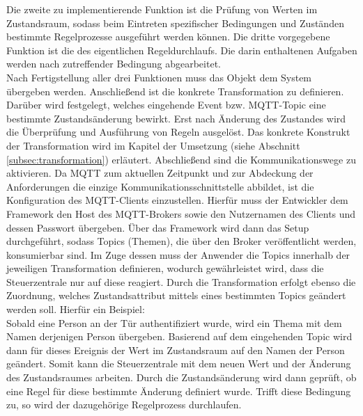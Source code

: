         Die zweite zu implementierende Funktion ist die Prüfung von Werten im Zustandsraum, sodass beim Eintreten spezifischer 
        Bedingungen und Zuständen bestimmte Regelprozesse ausgeführt werden können. Die dritte vorgegebene Funktion ist die 
        des eigentlichen Regeldurchlaufs. Die darin enthaltenen Aufgaben werden nach zutreffender Bedingung abgearbeitet.
        \\
        Nach Fertigstellung aller drei Funktionen muss das Objekt dem System übergeben werden. Anschließend ist die 
        konkrete Transformation zu definieren. Darüber wird festgelegt, welches eingehende Event bzw. \acs{MQTT}-Topic 
        eine bestimmte Zustandsänderung bewirkt. Erst nach Änderung des Zustandes wird die Überprüfung und Ausführung 
        von Regeln ausgelöst. Das konkrete Konstrukt der Transformation wird im Kapitel der Umsetzung (siehe Abschnitt \ref{subsec:transformation}) 
        erläutert. Abschließend sind die Kommunikationswege zu aktivieren. 
        Da \acs{MQTT} zum aktuellen Zeitpunkt und zur Abdeckung der Anforderungen die einzige Kommunikationsschnittstelle 
        abbildet, ist die Konfiguration des \acs{MQTT}-Clients einzustellen. Hierfür muss der Entwickler 
        dem Framework den Host des \acs{MQTT}-Brokers sowie den Nutzernamen des Clients und dessen Passwort übergeben. Über das 
        Framework wird dann das Setup durchgeführt, sodass Topics (Themen), die über den Broker veröffentlicht werden, konsumierbar 
        sind. Im Zuge dessen muss der Anwender die Topics innerhalb der jeweiligen Transformation definieren, wodurch gewährleistet wird, dass 
        die Steuerzentrale nur auf diese reagiert. Durch die Transformation erfolgt ebenso die 
        Zuordnung, welches Zustandsattribut mittels eines bestimmten Topics geändert werden soll. Hierfür ein Beispiel:  
        \\
        \linebreak
        Sobald eine Person an der Tür authentifiziert wurde, wird ein Thema mit dem Namen derjenigen Person übergeben. Basierend auf 
        dem eingehenden Topic wird dann für dieses Ereignis der Wert im Zustandsraum auf den Namen der Person geändert. Somit kann 
        die Steuerzentrale mit dem neuen Wert und der Änderung des Zustandsraumes arbeiten. Durch die Zustandsänderung wird dann 
        geprüft, ob eine Regel für diese bestimmte Änderung definiert wurde. Trifft diese Bedingung zu, so wird der dazugehörige Regelprozess 
        durchlaufen.  
        \\
        \linebreak
